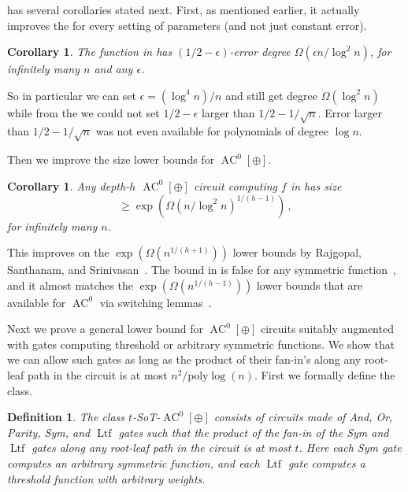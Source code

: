 \documentclass{toc}
\newtheorem{cor}[theorem]{Corollary}
\newtheorem{defn}[theorem]{Definition}
\DeclareMathOperator{\Ltf}{\mathrm{Ltf}}  %
\DeclareMathOperator{\AC}{\mathrm{AC}}  %
\newcommand{\poly}{\mathrm{poly}}
\newcommand{\e}{\epsilon}
\begin{document}
 has several corollaries
stated next. First, as mentioned earlier, it actually improves the
 for every setting of parameters (and
not just constant error).
\begin{cor}
\label{cor:tradeoff}The function in 
has $(1/2-\e)$-error degree $\Omega(\e n/\log^{2}n)$, for infinitely
many $n$ and any $\e$.
\end{cor}

So in particular we can set $\e=(\log^{4}n)/n$ and still get degree
%
$\Omega(\log^{2}n)$ while  %
from the 
we could not set $1/2-\e$ larger than $1/2-1/\sqrt{n}$. Error larger
than $1/2-1/\sqrt{n}$ was not even available for polynomials of degree
$\log n$.

%

Then we improve the size lower bounds for $\AC^{0}[\oplus]$.
\begin{cor}          %
\label{cor:size}Any depth-$h$ $\AC^{0}[\oplus]$ circuit computing
$f$ in  has size
%
%
\[ \ge\exp(\Omega(n/\log^{2}n)^{1/(h-1)})\,, \]  %
for infinitely many $n$.
\end{cor}

This improves on the $\exp(\Omega(n^{1/(h+1)}))$ lower bounds
%
%
by Rajgopal, Santhanam, and Srinivasan~\cite{DBLP:conf/mfcs/RajgopalS018}.
The bound in  is false for any symmetric
function~\cite{DBLP:conf/coco/OliveiraS019}, and it almost matches
the $\exp(\Omega(n^{1/(h-1)}))$ lower bounds that are available for
$\AC^{0}$ via switching lemmas~\cite{Has87}.

Next we prove a general lower bound for $\AC^{0}[\oplus]$ circuits
suitably augmented with gates computing threshold or arbitrary symmetric
functions. We show that we can allow such gates as long as the product
of their fan-in's along any root-leaf path in the circuit is at most
%
$n^{2}/\poly\log(n)$.   %
First we formally define the class.
\begin{defn}
The class $t$-SoT-$\AC^{0}[\oplus]$ consists of circuits made of
And, Or, Parity, Sym, and $\Ltf$ gates such that the product of the fan-in
of the Sym and $\Ltf$ gates along any root-leaf path in the circuit is
at most $t$. Here each Sym gate computes an arbitrary symmetric function,
and each $\Ltf$ gate computes a threshold function with arbitrary weights.
\end{defn}
\end{document}
